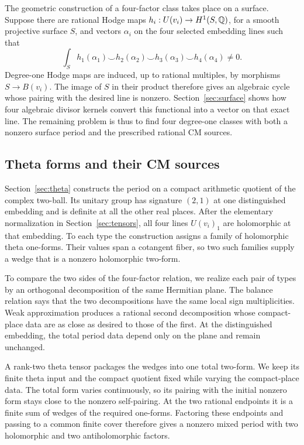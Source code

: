The geometric construction of a four-factor class takes place on a
surface.  Suppose there are rational Hodge maps
\(h_i:U(v_i)\to H^1(S,\mathbb{Q})\), for a smooth projective surface
\(S\), and vectors \(\alpha_i\) on the four selected embedding
lines such that
\[
 \int_S h_1(\alpha_1)\smile h_2(\alpha_2)
              \smile h_3(\alpha_3)\smile h_4(\alpha_4)\ne0.
\]
Degree-one Hodge maps are induced, up to rational multiples, by
morphisms \(S\to B(v_i)\).  The image of \(S\) in their product
therefore gives an algebraic cycle whose pairing with the desired
line is nonzero.  Section~\ref{sec:surface} shows how four algebraic
divisor kernels convert this functional into a vector on that exact
line.  The remaining problem is thus to find four degree-one classes
with both a nonzero surface period and the prescribed rational CM
sources.

\subsection{Theta forms and their CM sources}

Section~\ref{sec:theta} constructs the period on a compact arithmetic
quotient of the complex two-ball.  Its unitary group has signature
\((2,1)\) at one distinguished embedding and is definite at all the
other real places.  After the elementary normalization in
Section~\ref{sec:tensors}, all four lines \(U(v_i)_1\) are holomorphic
at that embedding.  To each type the construction assigns a family
of holomorphic theta one-forms.  Their values span a cotangent fiber,
so two such families supply a wedge that is a nonzero holomorphic
two-form.

To compare the two sides of the four-factor relation, we realize each
pair of types by an orthogonal decomposition of the same Hermitian
plane.  The balance relation says that the two decompositions have
the same local sign multiplicities.  Weak approximation produces a
rational second decomposition whose compact-place data are as close
as desired to those of the first.  At the distinguished embedding,
the total period data depend only on the plane and remain unchanged.

A rank-two theta tensor packages the wedges into one total two-form.
We keep its finite theta input and the compact quotient fixed while
varying the compact-place data.  The total form varies continuously,
so its pairing with the initial nonzero form stays close to the
nonzero self-pairing.  At the two rational endpoints it is a finite
sum of wedges of the required one-forms.  Factoring these endpoints
and passing to a common finite cover therefore gives a nonzero mixed
period with two holomorphic and two antiholomorphic factors.

